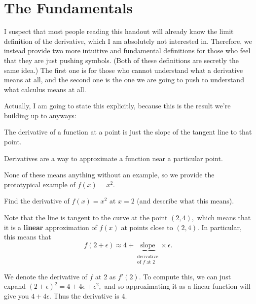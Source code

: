 \documentclass[blue,onecol]{shooting}
\begin{document}
\section{The Fundamentals}
I suspect that most people reading this handout will already know the limit definition of the derivative, which I am absolutely not interested in. Therefore, we instead provide two more intuitive and fundamental definitions for those who feel that they are just pushing symbols. (Both of these definitions are secretly the same idea.) The first one is for those who cannot understand what a derivative means at all, and the second one is the one we are going to push to understand what calculus means at all.

Actually, I am going to state this explicitly, because this is the result we're building up to anyways: 

\begin{defi}
The derivative of a function at a point is just the slope of the tangent line to that point.
\end{defi}

\begin{defi}
Derivatives are a way to approximate a function near a particular point.
\end{defi}

None of these means anything without an example, so we provide the prototypical example of $f(x)=x^2.$

\begin{exam}
Find the derivative of $f(x)=x^2$ at $x=2$ (and describe what this means).

\begin{center}
\end{center}
\end{exam}

\begin{sol}
Note that the line is tangent to the curve at the point $(2,4),$ which means that it is a \textbf{linear} approximation of $f(x)$ at points close to $(2,4).$ In particular, this means that
\[f(2+\epsilon)\approx 4+\underbrace{\text{slope}}_{\substack{\text{derivative} \\ \text{of } f \text{ at }2}}\times \epsilon.\]

We denote the derivative of $f$ at $2$ as $f'(2).$ To compute this, we can just expand $(2+\epsilon)^2=4+4\epsilon+\epsilon^2,$ and so approximating it as a linear function will give you $4+4\epsilon.$ Thus the derivative is $4.$
\end{sol}
\end{document}
